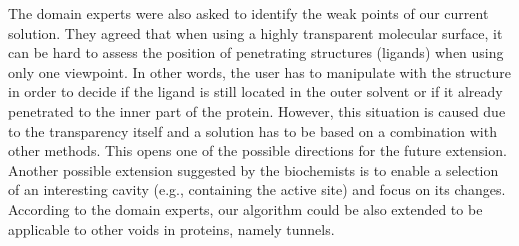 The domain experts were also asked to identify the weak points of our current solution.
They agreed that when using a highly transparent molecular surface, it can be hard to assess the position of penetrating structures (ligands) when using only one viewpoint.
In other words, the user has to manipulate with the structure in order to decide if the ligand is still located in the outer solvent or if it already penetrated to the inner part of the protein.
However, this situation is caused due to the transparency itself and a solution has to be based on a combination with other methods.
This opens one of the possible directions for the future extension.
Another possible extension suggested by the biochemists is to enable a selection of an interesting cavity (e.g., containing the active site) and focus on its changes.
According to the domain experts, our algorithm could be also extended to be applicable to other voids in proteins, namely tunnels.



